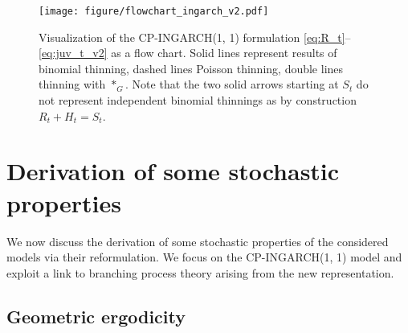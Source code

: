 \documentclass{article}
\begin{document}
\begin{figure}[h!]
\center
\texttt{[image: figure/flowchart\_ingarch\_v2.pdf]}
\caption{Visualization of the CP-INGARCH(1, 1) formulation \eqref{eq:R_t}--\eqref{eq:juv_t_v2} as a flow chart. Solid lines represent results of binomial thinning, dashed lines Poisson thinning, double lines thinning with $*_G$. Note that the two solid arrows starting at $S_t$ do not represent independent binomial thinnings as by construction  $R_t + H_t = S_t$.}
\label{fig:ingarch_flowchart}
\end{figure}



\section{Derivation of some stochastic properties}

We now discuss the derivation of some stochastic properties of the considered models via their reformulation. We focus on the CP-INGARCH(1, 1) model and exploit a link to branching process theory arising from the new representation.

\subsection{Geometric ergodicity}
\end{document}
